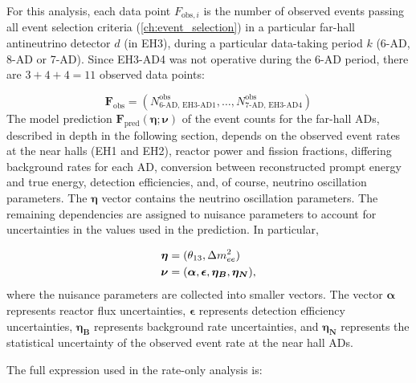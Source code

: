 For this analysis, each data point $F_{\text{obs},i}$
is the number of observed events passing all event selection criteria
(\cref{ch:event_selection})
in a particular far-hall antineutrino detector $d$ (in EH3),
during a particular data-taking period $k$ (6-AD, 8-AD or 7-AD).
Since EH3-AD4 was not operative during the 6-AD period,
there are $3 + 4 + 4 = 11$ observed data points:

\begin{equation}
    \mathbf{F}_{\text{obs}} =
    (N^{\text{obs}}_{\text{6-AD, EH3-AD1}}, \ldots, N^{\text{obs}}_{\text{7-AD, EH3-AD4}})
\end{equation}
The model prediction
$\mathbf{F}_{\text{pred}}(\boldsymbol{\eta};\boldsymbol{\nu})$
of the event counts for the far-hall ADs,
described in depth in the following section,
depends on the observed event rates at the near halls (EH1 and EH2),
reactor power and fission fractions,
differing background rates for each AD,
conversion between reconstructed prompt energy and true \nuebar{} energy,
detection efficiencies,
and, of course, neutrino oscillation parameters.
The $\boldsymbol{\eta}$ vector contains the neutrino oscillation parameters.
The remaining dependencies are assigned to nuisance parameters
to account for uncertainties in the values used in the prediction.
In particular,

\begin{align}
    \begin{split}
        \boldsymbol{\eta} &= (\theta_{13}, \Delta m^2_{ee}) \\
        \boldsymbol{\nu} &= (
            \boldsymbol{\alpha},
            \boldsymbol{\epsilon},
            \boldsymbol{\eta_B},
            \boldsymbol{\eta_N}),
    \end{split}
\end{align}
where the nuisance parameters are collected into smaller vectors.
The vector $\boldsymbol{\alpha}$ represents reactor flux uncertainties,
$\boldsymbol{\epsilon}$ represents detection efficiency uncertainties,
$\boldsymbol{\eta_B}$ represents background rate uncertainties,
and $\boldsymbol{\eta_N}$ represents the statistical uncertainty
of the observed event rate at the near hall ADs.

The full \chisquare{} expression used in the rate-only analysis is:


